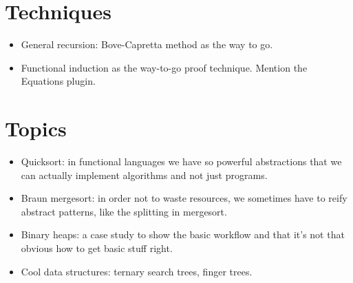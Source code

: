 \documentclass[declaration,mgr,english,shortabstract]{iithesis}
\begin{document}
\section{Techniques}
\begin{itemize}
    \item General recursion: Bove-Capretta method as the way to go.
    \item Functional induction as the way-to-go proof technique. Mention the Equations plugin.
\end{itemize}

\section{Topics}
\begin{itemize}
    \item Quicksort: in functional languages we have so powerful abstractions that we can actually implement \*algorithms\* and not just programs.
    \item  Braun mergesort: in order not to waste resources, we sometimes have to reify abstract patterns, like the splitting in mergesort.
    \item Binary heaps: a case study to show the basic workflow and that it's not that obvious how to get basic stuff right.
    \item Cool data structures: ternary search trees, finger trees.
\end{itemize}


\end{document}
